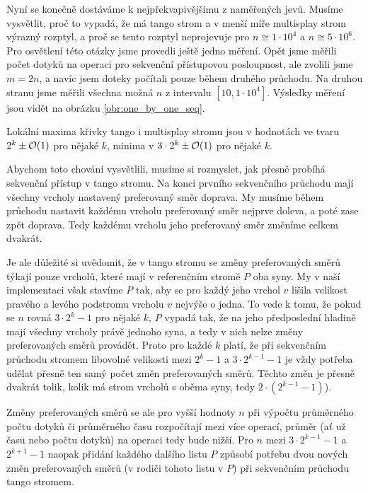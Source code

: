 Nyní se konečně dostáváme k nejpřekvapivějšímu z naměřených jevů. Musíme
vysvětlit, proč to vypadá, že má tango strom a v menší míře multisplay strom
výrazný rozptyl, a proč se tento rozptyl neprojevuje pro $n\cong 1\cdot 10^4$ a
$n\cong 5\cdot10^6$. Pro osvětlení této otázky jsme provedli ještě jedno
měření. Opět jsme měřili počet dotyků na operaci pro sekvenční přístupovou
posloupnost, ale zvolili jsme $m=2n$, a navíc jsem doteky počítali pouze během
druhého průchodu. Na druhou stranu jsme měřili všechna možná $n$ z intervalu
$[10, 1\cdot10^4]$. Výsledky měření jsou vidět na obrázku
\ref{obr:one_by_one_seq}.


Lokální maxima křivky tango i multisplay stromu jsou v hodnotách ve tvaru $2^k \pm \mathcal O(1)$ pro nějaké $k$, minima v $3\cdot 2^k\pm \mathcal O(1)$ pro nějaké $k$. 

Abychom toto chování vysvětlili, musíme si rozmyslet, jak přesně probíhá
sekvenční přístup v tango stromu. Na konci prvního sekvenčního průchodu mají
všechny vrcholy nastavený preferovaný směr doprava. My musíme během průchodu
nastavit každému vrcholu preferovaný směr nejprve doleva, a poté zase zpět
doprava. Tedy každému vrcholu jeho preferovaný směr změníme celkem dvakrát.

Je ale důležité si uvědomit, že v tango stromu se změny preferovaných směrů
týkají pouze vrcholů, které mají v referenčním stromě $P$ oba syny. My v naší
implementaci však stavíme $P$ tak, aby se pro každý jeho vrchol $v$ lišila
velikost pravého a levého podstromu vrcholu $v$ nejvýše o jedna. To vede k tomu, že pokud se
$n$ rovná $3\cdot2^k-1$ pro nějaké $k$, $P$ vypadá tak, že na jeho předposlední
hladině mají všechny vrcholy právě jednoho syna, a tedy v nich nelze změny
preferovaných směrů provádět. Proto pro každé $k$ platí, že při sekvenčním
průchodu stromem libovolné velikosti mezi $2^k-1$ a $3\cdot 2^{k-1}-1$ je vždy
potřeba udělat přesně ten samý počet změn preferovaných směrů. Těchto změn je přesně
dvakrát tolik, kolik má strom vrcholů s oběma syny, tedy $2\cdot(2^{k-1} -1)$).

Změny preferovaných směrů se ale pro vyšší hodnoty $n$ při výpočtu
průměrného počtu dotyků či průměrného času rozpočítají mezi více operací,
průměr (ať už času nebo počtu dotyků) na operaci tedy bude nižší. Pro $n$
 mezi $3\cdot 2^{k-1}-1$ a $2^{k+1}-1$ naopak přidání každého dalšího listu $P$ způsobí potřebu dvou nových změn preferovaných směrů (v rodiči tohoto listu v $P$) při sekvenčním průchodu tango stromem.


